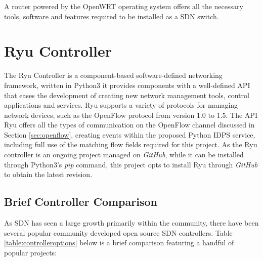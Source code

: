 \documentclass[12pt, oneside]{book}
\begin{document}
A router powered by the OpenWRT operating system offers all the necessary tools, software and features required to be installed 
as a SDN switch.

\newpage

\section{Ryu Controller}
\label{sec:ryuC}
The Ryu Controller is a component-based software-defined networking framework, written in Python3 it provides
components with a well-defined API that eases the development of creating new network management tools, control applications and
services. Ryu supports a variety of protocols for managing network devices, such as the OpenFlow protocol from version 1.0 to 1.5.
The API Ryu offers all the types of communication on the OpenFlow channel discussed in Section \ref{sec:openflow},
creating events within the proposed Python IDPS service, including full use of the matching flow fields required for this project.
As the Ryu controller is an ongoing project managed on \emph{GitHub}, while it  can be installed
through Python3's \emph{pip} command, this project opts to install Ryu through \emph{GitHub} to obtain the latest revision\cite{ryusdnframework}.


\subsection{Brief Controller Comparison}
As SDN has seen a large growth primarily within the community, there have been several popular community developed open source 
SDN controllers. Table \ref{table:controlleroptions} below is a brief comparison featuring a handful of popular projects:
\end{document}
